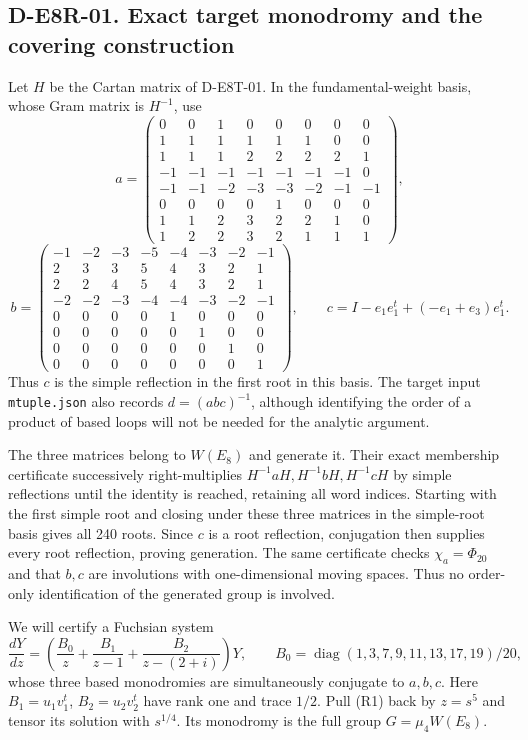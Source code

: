 \subsection*{D-E8R-01. Exact target monodromy and the covering construction}
Let $H$ be the Cartan matrix of D-E8T-01. In the fundamental-weight
basis, whose Gram matrix is $H^{-1}$, use
\[
a=\begin{pmatrix}
0&0&1&0&0&0&0&0\\
1&1&1&1&1&1&0&0\\
1&1&1&2&2&2&2&1\\
-1&-1&-1&-1&-1&-1&-1&0\\
-1&-1&-2&-3&-3&-2&-1&-1\\
0&0&0&0&1&0&0&0\\
1&1&2&3&2&2&1&0\\
1&2&2&3&2&1&1&1
\end{pmatrix},
\]
\[
b=\begin{pmatrix}
-1&-2&-3&-5&-4&-3&-2&-1\\
2&3&3&5&4&3&2&1\\
2&2&4&5&4&3&2&1\\
-2&-2&-3&-4&-4&-3&-2&-1\\
0&0&0&0&1&0&0&0\\
0&0&0&0&0&1&0&0\\
0&0&0&0&0&0&1&0\\
0&0&0&0&0&0&0&1
\end{pmatrix},\qquad
c=I-e_1e_1^t+(-e_1+e_3)e_1^t.
\]
Thus $c$ is the simple reflection in the first root in this basis.
The target input \texttt{mtuple.json} also records $d=(abc)^{-1}$,
although identifying the order of a product of based loops will not
be needed for the analytic argument.

The three matrices belong to $W(E_8)$ and generate it. Their exact
membership certificate successively right-multiplies
$H^{-1}aH,H^{-1}bH,H^{-1}cH$ by simple reflections until the identity
is reached, retaining all word indices. Starting with the first
simple root and closing under these three matrices in the simple-root
basis gives all 240 roots. Since $c$ is a root reflection, conjugation
then supplies every root reflection, proving generation. The same
certificate checks $\chi_a=\Phi_{20}$ and that $b,c$ are involutions
with one-dimensional moving spaces. Thus no order-only identification
of the generated group is involved.

We will certify a Fuchsian system
\[
\frac{dY}{dz}=
 \left(\frac{B_0}{z}+\frac{B_1}{z-1}
                    +\frac{B_2}{z-(2+i)}\right)Y,
\qquad
B_0=\operatorname{diag}(1,3,7,9,11,13,17,19)/20,
\tag{R1}
\]
whose three based monodromies are simultaneously conjugate to
$a,b,c$. Here $B_1=u_1v_1^t$, $B_2=u_2v_2^t$ have rank one and
trace $1/2$. Pull (R1) back by $z=s^5$ and tensor its solution with
$s^{1/4}$. Its monodromy is the full group $G=\mu_4W(E_8)$.

